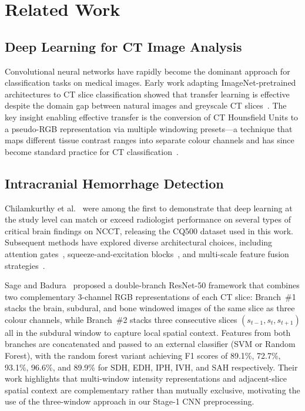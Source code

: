 \section{Related Work}
\label{sec:related_work}

\subsection{Deep Learning for CT Image Analysis}

Convolutional neural networks have rapidly become the dominant approach
for classification tasks on medical images.
Early work adapting ImageNet-pretrained architectures to CT slice
classification showed that transfer learning is effective despite the
domain gap between natural images and greyscale CT
slices~\cite{shin2016deeplearning,tajbakhsh2016convolutional}.
The key insight enabling effective transfer is the conversion of CT
Hounsfield Units to a pseudo-RGB representation via multiple windowing
presets---a technique that maps different tissue contrast ranges into
separate colour channels and has since become standard practice for CT
classification~\cite{chilamkurthy2018cq500,wang2021deeplearning}.

\subsection{Intracranial Hemorrhage Detection}

Chilamkurthy et al.~\cite{chilamkurthy2018cq500} were among the first to
demonstrate that deep learning at the study level can match or exceed
radiologist performance on several types of critical brain findings on
NCCT, releasing the CQ500 dataset used in this work.
Subsequent methods have explored diverse architectural choices, including
attention gates~\cite{schlemper2019attention}, squeeze-and-excitation
blocks~\cite{hu2018squeeze}, and multi-scale feature fusion
strategies~\cite{ye2019hemorrhage}.

Sage and Badura~\cite{sage2020doublebranch} proposed a double-branch
ResNet-50 framework that combines two complementary 3-channel RGB
representations of each CT slice: Branch~\#1 stacks the brain, subdural,
and bone windowed images of the same slice as three colour channels,
while Branch~\#2 stacks three consecutive slices $(s_{t-1}, s_t, s_{t+1})$
all in the subdural window to capture local spatial context.
Features from both branches are concatenated and passed to an external
classifier (SVM or Random Forest), with the random forest variant
achieving F1 scores of 89.1\%, 72.7\%, 93.1\%, 96.6\%, and 89.9\%
for SDH, EDH, IPH, IVH, and SAH respectively.
Their work highlights that multi-window intensity representations and
adjacent-slice spatial context are complementary rather than
mutually exclusive, motivating the use of the three-window approach
in our Stage-1 CNN preprocessing.

